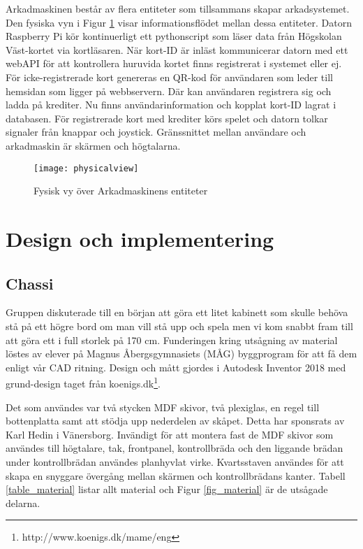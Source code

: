 \documentclass[12pt,fleqn,openany]{book} %
\begin{document}
Arkadmaskinen består av flera entiteter som tillsammans skapar arkadsystemet. Den fysiska vyn i Figur \ref{fig_physview} visar informationsflödet 
mellan dessa entiteter. Datorn Raspberry Pi kör kontinuerligt ett pythonscript som läser data från Högskolan Väst-kortet via kortläsaren. 
När kort-ID är inläst kommunicerar datorn med ett webAPI för att kontrollera huruvida kortet finns registrerat i systemet eller ej. För 
icke-registrerade kort genereras en QR-kod för användaren som leder till hemsidan som ligger på webbservern. Där kan användaren 
registrera sig och ladda på krediter. Nu finns användarinformation och kopplat kort-ID lagrat i databasen. För registrerade kort med 
krediter körs spelet och datorn tolkar signaler från knappar och joystick. Gränssnittet mellan användare och arkadmaskin är skärmen 
och högtalarna.

\begin{figure}[!h]
\centering\texttt{[image: physicalview]}
\caption{Fysisk vy över Arkadmaskinens entiteter}
\label{fig_physview}
\end{figure}


\chapter{Design och implementering}
\section{Chassi}
Gruppen diskuterade till en början att göra ett litet kabinett som skulle behöva stå på ett högre bord om man vill stå upp och
spela men vi kom snabbt fram till att göra ett i full storlek på 170 cm. Funderingen kring utsågning av material löstes av elever
på Magnus Åbergsgymnasiets (MÅG) byggprogram för att få dem enligt vår CAD ritning. Design och mått gjordes i Autodesk Inventor 
2018 med grund-design taget från koenigs.dk\footnote{http://www.koenigs.dk/mame/eng}.

Det som användes var två stycken MDF skivor, två plexiglas, en regel till bottenplatta samt att stödja upp nederdelen av skåpet. 
Detta har sponsrats av Karl Hedin i Vänersborg. Invändigt för att montera fast de MDF skivor som användes till högtalare, tak, 
frontpanel, kontrollbräda och den liggande brädan under kontrollbrädan användes planhyvlat virke. Kvartsstaven användes för att 
skapa en snyggare övergång mellan skärmen och kontrollbrädans kanter. Tabell \ref{table_material} listar allt material och Figur \ref{fig_material} är de utsågade delarna.
\end{document}
